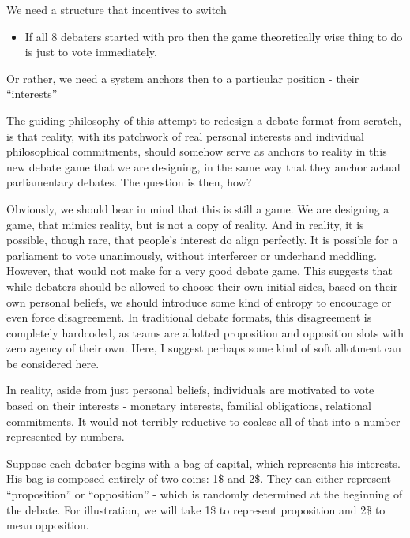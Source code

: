 We need a structure that incentives to switch

\begin{itemize}
    \item If all 8 debaters started with pro then the game theoretically wise thing to do is just to vote immediately.
\end{itemize}

Or rather, we need a system anchors then to a particular position - their ``interests''

The guiding philosophy of this attempt to redesign a debate format from scratch, is that reality, with its patchwork of real personal interests and individual philosophical commitments, should somehow serve as anchors to reality in this new debate game that we are designing, in the same way that they anchor actual parliamentary debates. The question is then, how?

Obviously, we should bear in mind that this is still a game. We are designing a game, that mimics reality, but is not a copy of reality. And in reality, it is possible, though rare, that people's interest do align perfectly. It is possible for a parliament to vote unanimously, without interfercer or underhand meddling. However, that would not make for a very good debate game. This suggests that while debaters should be allowed to choose their own initial sides, based on their own personal beliefs, we should introduce some kind of entropy to encourage or even force disagreement. In traditional debate formats, this disagreement is completely hardcoded, as teams are allotted proposition and opposition slots with zero agency of their own. Here, I suggest perhaps some kind of soft allotment can be considered here.

In reality, aside from just personal beliefs, individuals are motivated to vote based on their interests - monetary interests, familial obligations, relational commitments. It would not terribly reductive to coalese all of that into a number represented by numbers.

Suppose each debater begins with a bag of capital, which represents his interests. His bag is composed entirely of two coins: 1\$ and 2\$. They can either represent ``proposition'' or ``opposition'' - which is randomly determined at the beginning of the debate. For illustration, we will take 1\$ to represent proposition and 2\$ to mean opposition.

